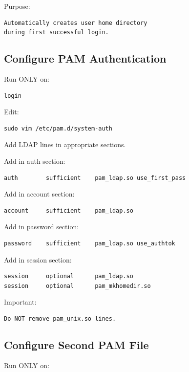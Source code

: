 \documentclass[11pt]{article}
\begin{document}
Purpose:

\begin{verbatim}
Automatically creates user home directory
during first successful login.
\end{verbatim}
\subsection{Configure PAM Authentication}
\label{sec:org1672221}

Run ONLY on:

\begin{verbatim}
login
\end{verbatim}

Edit:

\begin{verbatim}
sudo vim /etc/pam.d/system-auth
\end{verbatim}

Add LDAP lines in appropriate sections.

Add in auth section:

\begin{verbatim}
auth        sufficient    pam_ldap.so use_first_pass
\end{verbatim}

Add in account section:

\begin{verbatim}
account     sufficient    pam_ldap.so
\end{verbatim}

Add in password section:

\begin{verbatim}
password    sufficient    pam_ldap.so use_authtok
\end{verbatim}

Add in session section:

\begin{verbatim}
session     optional      pam_ldap.so
session     optional      pam_mkhomedir.so
\end{verbatim}

Important:

\begin{verbatim}
Do NOT remove pam_unix.so lines.
\end{verbatim}
\subsection{Configure Second PAM File}
\label{sec:org13656da}

Run ONLY on:
\end{document}
